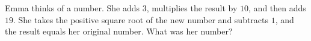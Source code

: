 Emma thinks of a number. She adds $3$, multiplies the result by $10$, and then adds $19$. She takes the positive square root of the new number and subtracts $1$, and the result equals her original number. What was her number?
